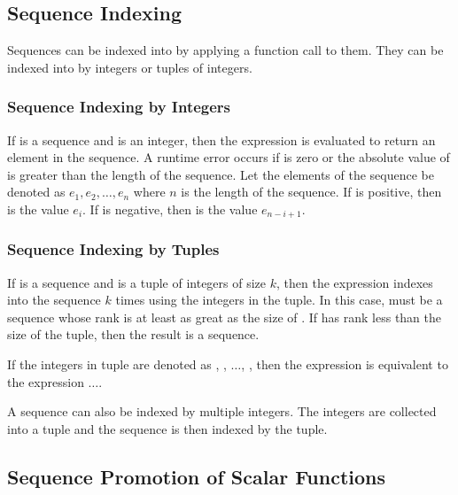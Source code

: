 \subsection{Sequence Indexing}
\label{Sequence_Indexing}

Sequences can be indexed into by applying a function call to them.
They can be indexed into by integers or tuples of integers.

\subsubsection{Sequence Indexing by Integers}
\label{Sequence_Indexing_by_Integers}

If  is a sequence and  is an integer, then the
expression  is evaluated to return an element in the
sequence.  A runtime error occurs if  is zero or the absolute
value of  is greater than the length of the sequence.  Let the
elements of the sequence be denoted as $e_1, e_2, \ldots, e_n$ where
$n$ is the length of the sequence.  If  is positive,
then  is the value $e_i$.  If  is negative,
then  is the value $e_{n-i+1}$.

\subsubsection{Sequence Indexing by Tuples}
\label{Sequence_Indexing_by_Tuples}

If  is a sequence and  is a tuple of integers of size
$k$, then the expression  indexes into the
sequence  $k$ times using the integers in the tuple.  In this
case,  must be a sequence whose rank is at least as great as
the size of .  If  has rank less than the size of the
tuple, then the result is a sequence.

If the integers in tuple  are denoted as , ,
$\ldots$, , then the expression  is equivalent to
the expression $\ldots$.

A sequence can also be indexed by multiple integers.  The integers are
collected into a tuple and the sequence is then indexed by the tuple.

\subsection{Sequence Promotion of Scalar Functions}
\label{Sequence_Promotion_of_Scalar_Functions}

